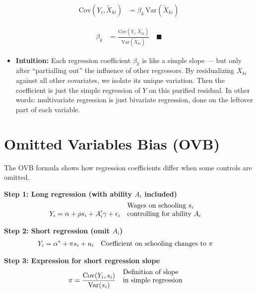 \documentclass[12pt]{article}
\begin{document}
\begin{align}
\text{Cov}(Y_i, \tilde{X}_{ki}) &= \beta_k \,\text{Var}(\tilde{X}_{ki}) 
\end{align}

\begin{align}
\beta_k &= \frac{\text{Cov}(Y_i, \tilde{X}_{ki})}{\text{Var}(\tilde{X}_{ki})} \quad \blacksquare
\end{align}

\begin{itemize}
    \item \textbf{Intuition:} Each regression coefficient $\beta_k$ is like a simple slope — but only after “partialling out” the influence of other regressors. By residualizing $X_{ki}$ against all other covariates, we isolate its unique variation. Then the coefficient is just the simple regression of $Y$ on this purified residual. In other words: multivariate regression is just bivariate regression, done on the leftover part of each variable.
\end{itemize}

\section*{\noindent\textbf{Omitted Variables Bias (OVB)}}

\noindent The OVB formula shows how regression coefficients differ when some controls are omitted.  

\singlespacing
\noindent \textbf{Step 1: Long regression (with ability $A_i$ included)}  
\begin{align}
Y_i &= \alpha + \rho s_i + A_i'\gamma + \epsilon_i && \text{\shortstack[l]{Wages on schooling $s_i$ \\ controlling for ability $A_i$}} 
\end{align}

\vspace{1em}
\noindent \textbf{Step 2: Short regression (omit $A_i$)}  
\begin{align}
Y_i &= \alpha^* + \pi s_i + u_i && \text{\shortstack[l]{Coefficient on schooling changes to $\pi$}}
\end{align}

\vspace{1em}
\noindent \textbf{Step 3: Expression for short regression slope}  
\begin{align}
\pi &= \frac{\text{Cov}(Y_i, s_i)}{\text{Var}(s_i)} && \text{\shortstack[l]{Definition of slope \\ in simple regression}}
\end{align}
\end{document}
